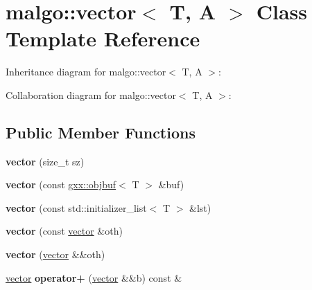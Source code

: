 \hypertarget{classmalgo_1_1vector}{}\section{malgo\+:\+:vector$<$ T, A $>$ Class Template Reference}
\label{classmalgo_1_1vector}


Inheritance diagram for malgo\+:\+:vector$<$ T, A $>$\+:


Collaboration diagram for malgo\+:\+:vector$<$ T, A $>$\+:
\subsection*{Public Member Functions}
\begin{DoxyCompactItemize}
\item 
{\bfseries vector} (size\+\_\+t sz)\hypertarget{classmalgo_1_1vector_ad9ebe4b65d1c6a2f4d47acdb68242b48}{}\label{classmalgo_1_1vector_ad9ebe4b65d1c6a2f4d47acdb68242b48}

\item 
{\bfseries vector} (const \hyperlink{classgxx_1_1object__buffer}{gxx\+::objbuf}$<$ T $>$ \&buf)\hypertarget{classmalgo_1_1vector_a71203b7d969ef122eb30ae4f9287d5d4}{}\label{classmalgo_1_1vector_a71203b7d969ef122eb30ae4f9287d5d4}

\item 
{\bfseries vector} (const std\+::initializer\+\_\+list$<$ T $>$ \&lst)\hypertarget{classmalgo_1_1vector_a8fc0bbf6213b321ad4859747abbd843e}{}\label{classmalgo_1_1vector_a8fc0bbf6213b321ad4859747abbd843e}

\item 
{\bfseries vector} (const \hyperlink{classmalgo_1_1vector}{vector} \&oth)\hypertarget{classmalgo_1_1vector_ae77b60fcf60719ab2b0c72589626a2e3}{}\label{classmalgo_1_1vector_ae77b60fcf60719ab2b0c72589626a2e3}

\item 
{\bfseries vector} (\hyperlink{classmalgo_1_1vector}{vector} \&\&oth)\hypertarget{classmalgo_1_1vector_a85fe95e028701bf3b81d6c1c99bd4f52}{}\label{classmalgo_1_1vector_a85fe95e028701bf3b81d6c1c99bd4f52}

\item 
\hyperlink{classmalgo_1_1vector}{vector} {\bfseries operator+} (\hyperlink{classmalgo_1_1vector}{vector} \&\&b) const \&\hypertarget{classmalgo_1_1vector_aa021ae39e3f03c0a11b2426ea827794c}{}\label{classmalgo_1_1vector_aa021ae39e3f03c0a11b2426ea827794c}


\end{DoxyCompactItemize}
